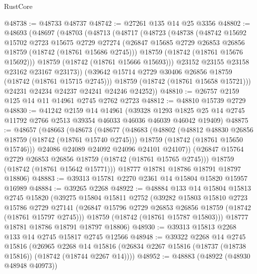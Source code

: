 \begin{lexlean}{RustCore}
\begin{coremodule}
@48738 := @48733 @48737
@48742 := @27261 @135 @14 @25 @3356
@48802 := @48693
    (@48697
      (@48703
        (@48713
          (@48717
            (@48723
              (@48738
                (@48742
                  @15692
                  @15702
                  @2723
                  @15675
                  @2729
                  @27274
                  (@26847 @15685 @2729 @26853 @26856 @18759 (@18742 (@18761 @15686 @2745)))
                  @18759
                  (@18742 (@18761 @15676 @15692)))
                @18759
                (@18742 (@18761 @15666 @15693)))
              @23152
              @23155
              @23158
              @23162
              @23167
              @23173))
          (@39642 @15714 @2729 @30406 @26856 @18759 (@18742 (@18761 @15715 @2745)))
          @18759
          (@18742 (@18761 @15658 @15721)))
        @24231
        @24234
        @24237
        @24241
        @24246
        @24252))
@48810 := @26757 @2159 @125 @14 @11 @14961 @2745 @2762 @2723
@48812 := @48810 @15739 @2729
@48830 := @41242
    @2159
    @14
    @14961
    (@39328 @1293 @1825 @25 @14 @2745 @11792 @2766 @2513 @39354 @46033 @46036 @46039 @46042 @19409)
@48875 := @48657
    (@48663
      (@48673
        (@48677
          (@48683
            (@48802
              (@48812 @48830 @26856 @18759 (@18742 (@18761 @15740 @2745)))
              @18759
              (@18742 (@18761 @15650 @15746)))
            @24086
            @24089
            @24092
            @24096
            @24101
            @24107))
        (@26847 @15764 @2729 @26853 @26856 @18759 (@18742 (@18761 @15765 @2745)))
        @18759
        (@18742 (@18761 @15642 @15771)))
      @18777
      @18781
      @18786
      @18791
      @18797
      @18806)
@48883 := @39313 @15781 @2270 @2361 @14 @15804 @15820 @15957 @16989
@48884 := @39265 @2268
@48922 := @48884
    @133
    @14
    @15804
    @15813
    @2745
    @15820
    (@39275
      @15804
      @15811
      @2752
      (@39282
        @15803
        @15810
        @2723
        @15786
        @2729
        @27141
        (@26847 @15796 @2729 @26853 @26856 @18759 (@18742 (@18761 @15797 @2745)))
        @18759
        (@18742 (@18761 @15787 @15803)))
      @18777
      @18781
      @18786
      @18791
      @18797
      @18806)
@48930 := @39313 @15813 @2268 @133 @14 @2745 @15817 @2745 @12566
@48948 := @39322
    @2268
    @14
    @2745
    @15816
    (@26965
      @2268
      @14
      @15816
      (@26834 @2267 @15816 (@18737 (@18738 @15816)) (@18742 (@18744 @2267 @14))))
@48952 := @48883 (@48922 (@48930 @48948 @40973))

\end{coremodule}
\end{lexlean}
